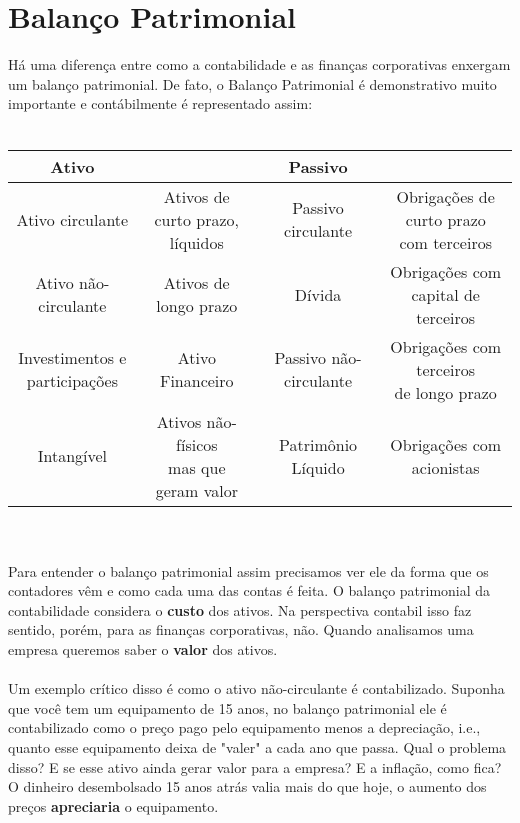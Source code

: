 \section{Balanço Patrimonial}
Há uma diferença entre como a contabilidade e as finanças corporativas enxergam um balanço patrimonial. De fato, o Balanço Patrimonial é demonstrativo muito importante e contábilmente é representado assim:
\\~\\
\begin{tabular}{| c c | c c |}
\hline
Ativo & & Passivo & \\
\hline
Ativo circulante &
\makecell{ Ativos de curto prazo, \\ líquidos} &
Passivo circulante &
\makecell{ Obrigações de curto prazo \\ com terceiros } \\
\hline
Ativo não-circulante &
\makecell{Ativos de \\ longo prazo }&
Dívida &
\makecell{Obrigações com \\ capital de terceiros} \\
\hline
\makecell{Investimentos e \\ participações} &
Ativo Financeiro &
Passivo não-circulante &
\makecell{Obrigações com terceiros \\ de longo prazo}\\ 
\hline
Intangível &
\makecell{Ativos não-físicos \\ mas que geram valor }&
Patrimônio Líquido &
\makecell{Obrigações com \\ acionistas}\\
\hline
\end{tabular}
\\~\\
Para entender o balanço patrimonial assim precisamos ver ele da forma que os contadores vêm e como cada uma das contas é feita. O balanço patrimonial da contabilidade considera o \textbf{custo} dos ativos. Na perspectiva contabil isso faz sentido, porém, para as finanças corporativas, não. Quando analisamos uma empresa queremos saber o \textbf{valor} dos ativos.
\\~\\
Um exemplo crítico disso é como o ativo não-circulante é contabilizado. Suponha que você tem um equipamento de 15 anos, no balanço patrimonial ele é contabilizado como o preço pago pelo equipamento menos a depreciação, i.e., quanto esse equipamento deixa de "valer" a cada ano que passa. Qual o problema disso? E se esse ativo ainda gerar valor para a empresa? E a inflação, como fica? O dinheiro desembolsado 15 anos atrás valia mais do que hoje, o aumento dos preços \textbf{apreciaria} o equipamento.
